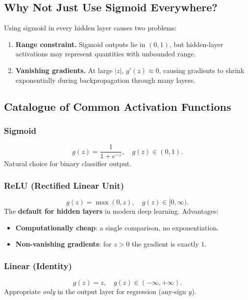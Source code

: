 \subsection{Why Not Just Use Sigmoid Everywhere?}

Using sigmoid in every hidden layer causes two problems:
\begin{enumerate}
\item \textbf{Range constraint.} Sigmoid outputs lie in $(0,1)$, but
  hidden-layer activations may represent quantities with unbounded range.
\item \textbf{Vanishing gradients.} At large $|z|$, $g'(z)\approx 0$, causing
  gradients to shrink exponentially during backpropagation through many layers.
\end{enumerate}

\subsection{Catalogue of Common Activation Functions}

\subsubsection{Sigmoid}
\begin{equation}
g(z)=\frac{1}{1+e^{-z}},\quad g(z)\in(0,1).
\end{equation}
Natural choice for binary classifier output.

\subsubsection{ReLU (Rectified Linear Unit)}
\begin{equation}
g(z)=\max(0,z),\quad g(z)\in[0,\infty).
\end{equation}
The \textbf{default for hidden layers} in modern deep learning. Advantages:
\begin{itemize}
\item \textbf{Computationally cheap}: a single comparison, no exponentiation.
\item \textbf{Non-vanishing gradients}: for $z>0$ the gradient is exactly $1$.
\end{itemize}

\subsubsection{Linear (Identity)}
\begin{equation}
g(z)=z,\quad g(z)\in(-\infty,+\infty).
\end{equation}
Appropriate \emph{only} in the output layer for regression (any-sign $y$).

